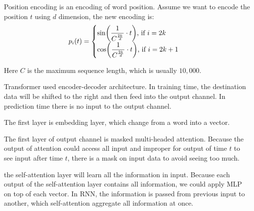 \begin{definition}
    Position encoding is an encoding of word position. Assume we want to encode the position $t$ using $d$ dimension, the new encoding is:
    \begin{equation}
        \begin{aligned}
            p_i (t) = \begin{cases}
            \displaystyle \sin\mleft(\frac{1}{C^{\frac{2k}{d}}} \cdot t \mright)  \textrm{, if }  i = 2k \\
            \displaystyle \cos\mleft(\frac{1}{C^{\frac{2k}{d}}} \cdot t \mright)  \textrm{, if }  i = 2k +1 \\
            \end{cases}
        \end{aligned}        
    \end{equation}
    
    Here $C$ is the maximum sequence length, which is usually $10,000$.
\end{definition}


Transformer used encoder-decoder architecture. In training time, the destination data will be shifted to the right and then feed into the output channel. In prediction time there is no input to the output channel.

The first layer is embedding layer, which change from a word into a vector.

The first layer of output channel is masked multi-headed attention. Because the output of attention could access all input and improper for output of time $t$ to see input after time $t$, there is a mask on input data to avoid seeing too much.

the self-attention layer will learn all the information in input. Because each output of the self-attention layer contains all information, we could apply MLP on top of each vector. In RNN, the information is passed from previous input to another, which self-attention aggregate all information at once.

